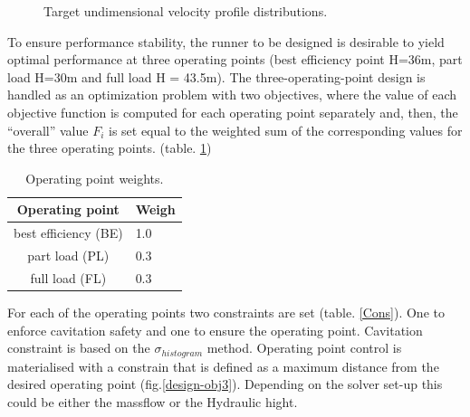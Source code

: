 \begin{figure}[h!]
\begin{minipage}[b]{1\linewidth}
 \centering
\end{minipage}
\caption{Target undimensional velocity profile distributions.}
\label{design-obj-tar}
\end{figure}


To ensure performance stability, the runner to be designed is desirable to yield optimal performance at three operating points (best efficiency point H=36m, part load H=30m and full load H = 43.5m). The three-operating-point design is handled as an optimization problem with two objectives, where the value of each objective function is computed for each operating point separately and, then, the “overall” value $F_i$ is set equal to the weighted sum of the corresponding values for the three operating points. (table. \ref{op-weights}) 

\begin{table}[h!]
\begin{center}
\begin{tabular}{ |c|l| }
\hline
Operating point& Weigh\\
\hline
best efficiency (BE)  & 1.0\\
\hline
part load (PL) & 0.3\\
\hline
full load (FL) & 0.3\\
\hline
\end{tabular}
\caption{Operating point weights.}
\label{op-weights}
\end{center}
\end{table}


For each of the operating points two constraints are set (table. \ref{Cons}). One to enforce cavitation safety and one to ensure the operating point. Cavitation constraint is based on the $\sigma_{histogram}$ method. Operating point control is materialised with a constrain that is defined as a maximum distance from the desired operating point (fig.\ref{design-obj3}). Depending on the solver set-up this could be either the massflow or the Hydraulic hight.     


